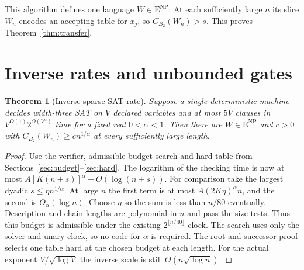 \documentclass[12pt,letterpaper]{article}
\newtheorem{theorem}{Theorem}
\newcommand{\ENP}{\mathrm{E}^{\mathrm{NP}}}
\newcommand{\size}{C_{B_2}}
\begin{document}
This algorithm defines one language \(W\in\ENP\). At each sufficiently
large \(n\) its slice \(W_n\) encodes an accepting table for \(x_j\), so
\(\size(W_n)>s\). This proves Theorem~\ref{thm:transfer}.

\section{Inverse rates and unbounded gates}\label{sec:inverse}

\begin{theorem}[Inverse sparse-SAT rate]\label{thm:inverse}
Suppose a single deterministic machine decides width-three SAT on
$V$ declared variables and at most $5V$ clauses in
$V^{O(1)}2^{O(V^\alpha)}$ time for a fixed real $0<\alpha<1$.
Then there are $W\in\ENP$ and $c>0$ with
$\size(W_n)\ge cn^{1/\alpha}$ at every sufficiently large length.
\end{theorem}
\begin{proof}
Use the verifier, admissible-budget search and hard table from
Sections~\ref{sec:budget}--\ref{sec:hard}. The logarithm of the
checking time is now at most $A[K(n+s)]^\alpha+O(\log(n+s))$.
For comparison take the largest dyadic $s\le\eta n^{1/\alpha}$.
At large $n$ the first term is at most
$A(2K\eta)^\alpha n$, and the second is $O_\alpha(\log n)$.
Choose $\eta$ so the sum is less than $n/80$ eventually. Description
and chain lengths are polynomial in $n$ and pass the size tests.
Thus this budget is admissible under the existing $2^{\lfloor n/40\rfloor}$
clock. The search uses only the solver and unary clock, so no code for
$\alpha$ is required. The root-and-successor proof selects one table
hard at the chosen budget at each length. For the actual exponent
$V/\sqrt{\log V}$ the inverse scale is still
$\Theta(n\sqrt{\log n})$.
\end{proof}
\end{document}
